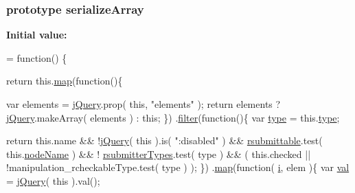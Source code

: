 \subsubsection[{serialize\+Array}]{ {\bf prototype} serialize\+Array}\label{jquery-1_810_82-vsdoc_8js_a0ba7b24b29b3762704d7b7da11b98315}
{\bfseries Initial value\+:}
\begin{DoxyCode}
= \textcolor{keyword}{function}() \{


        \textcolor{keywordflow}{return} this.\hyperlink{jquery-1_810_82-vsdoc_8js_a20838f8c4bedc779e51bf830f5a4d471}{map}(\textcolor{keyword}{function}()\{
            
            var elements = \hyperlink{jquery-1_810_82-vsdoc_8js_add5237586d970a38a81f990e8eb28c6c}{jQuery}.prop( \textcolor{keyword}{this}, \textcolor{stringliteral}{"elements"} );
            \textcolor{keywordflow}{return} elements ? \hyperlink{jquery-1_810_82-vsdoc_8js_add5237586d970a38a81f990e8eb28c6c}{jQuery}.makeArray( elements ) : \textcolor{keyword}{this};
        \})
        .\hyperlink{jquery-1_810_82-vsdoc_8js_ac99d0cf56cab46114f5765a14e03ad6d}{filter}(\textcolor{keyword}{function}()\{
            var \hyperlink{jquery-1_810_82-vsdoc_8js_a3940565e83a9bfd10d95ffd27536da91}{type} = this.\hyperlink{jquery-1_810_82-vsdoc_8js_a3940565e83a9bfd10d95ffd27536da91}{type};
            
            \textcolor{keywordflow}{return} this.name && !\hyperlink{jquery-1_810_82-vsdoc_8js_add5237586d970a38a81f990e8eb28c6c}{jQuery}( \textcolor{keyword}{this} ).is( \textcolor{stringliteral}{":disabled"} ) &&
                \hyperlink{_bibabook_2_scripts_2jquery-1_810_82_8js_a12d248d7e6c5985c5ea21f56fbef9e90}{rsubmittable}.test( this.\hyperlink{jquery-1_810_82-vsdoc_8js_a269e960a03eef49b8ed3a84932c1334d}{nodeName} ) && !
      \hyperlink{_bibabook_2_scripts_2jquery-1_810_82_8js_a0e9cd4ca08945afe827846f34a36c74a}{rsubmitterTypes}.test( type ) &&
                ( this.checked || !manipulation\_rcheckableType.test( type ) );
        \})
        .\hyperlink{jquery-1_810_82-vsdoc_8js_a20838f8c4bedc779e51bf830f5a4d471}{map}(\textcolor{keyword}{function}( \hyperlink{_bibabook_2_scripts_2respond_8min_8js_a5e25b1d1bed9ab5f3174b76d6a722180}{i}, elem )\{
            var \hyperlink{jquery-1_810_82-vsdoc_8js_a0888cacd53defa08fbb4972d54ece4b0}{val} = \hyperlink{jquery-1_810_82-vsdoc_8js_add5237586d970a38a81f990e8eb28c6c}{jQuery}( \textcolor{keyword}{this} ).val();


\end{DoxyCode}
